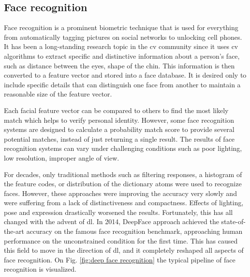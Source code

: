 
    \subsection{Face recognition}
        Face recognition is a prominent biometric technique that is used for everything from automatically tagging pictures on social networks to unlocking cell phones. It has been a long-standing research topic in the \gls{cv} community since it uses \gls{cv} algorithms to extract specific and distinctive information about a person's face, such as distance between the eyes, shape of the chin. This information is then converted to a feature vector and stored into a face database. It is desired only to include specific details that can distinguish one face from another to maintain a reasonable size of the feature vector. 
        
        Each facial feature vector can be compared to others to find the most likely match which helps to verify personal identity. However, some face recognition systems are designed to calculate a probability match score to provide several potential matches, instead of just returning a single result. The results of face recognition systems can vary under challenging conditions such as poor lighting, low resolution, improper angle of view.
        
        For decades, only traditional methods such as filtering responses, a histogram of the feature codes, or distribution of the dictionary atoms were used to recognize faces. However, these approaches were improving the accuracy very slowly and were suffering from a lack of distinctiveness and compactness. Effects of lighting, pose and expression drastically worsened the results. Fortunately, this has all changed with the advent of \gls{dl}. In 2014, DeepFace \cite{taigman2014deepface} approach achieved the state-of-the-art accuracy on the famous face recognition benchmark, approaching human performance on the unconstrained condition for the first time. This has caused this field to move in the direction of \gls{dl}, and it completely reshaped all aspects of face recognition. On Fig. \ref{fig:deep face recognition} the typical pipeline of face recognition is visualized.
        
